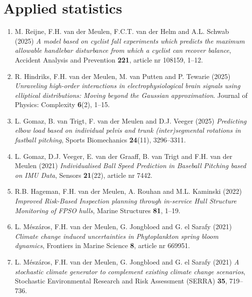 \documentclass[
10pt, %
a4paper, %
oneside, %
headinclude,footinclude, %
BCOR5mm, %
]{scrartcl}
\begin{document}
\section{Applied  statistics}

\begin{enumerate}
\item {\sc M. Reijne, F.H. van der Meulen, F.C.T. van der Helm and A.L. Schwab} (2025) {\it A model based on cyclist fall experiments which predicts the maximum allowable handlebar disturbance from which a cyclist can recover balance},
Accident Analysis and Prevention {\bf 221}, article nr 108159,
1--12.


\item  {\sc R. Hindriks, F.H. van der Meulen, M. van Putten and P. Tewarie} (2025) {\it Unraveling high-order interactions in electrophysiological brain signals using elliptical distributions: Moving beyond the Gaussian approximation}. Journal of Physics: Complexity {\bf 6}(2), 1--15.

\item {\sc L. Gomaz, B. van Trigt, F. van der Meulen and D.J. Veeger} (2025) {\it Predicting elbow load based on individual pelvis and trunk (inter)segmental rotations in fastball pitching}, Sports Biomechanics {\bf 24}(11), 3296--3311. 

\item {\sc L. Gomaz, D.J. Veeger, E. van der Graaff, B. van Trigt and F.H. van der Meulen (2021)} {\it  Individualised Ball Speed Prediction in Baseball Pitching based on IMU Data}, Sensors {\bf 21}(22), article nr 7442.  

\item {\sc R.B. Hageman, F.H. van der Meulen, A. Rouhan and M.L. Kaminski (2022)} {\it  Improved Risk-Based Inspection planning through in-service Hull Structure Monitoring of FPSO hulls}, Marine Structures {\bf 81}, 1--19.

\item {\sc L. M\'esz\'aros, F.H. van der Meulen, G. Jongbloed and G. el Sarafy (2021)} {\it Climate change induced uncertainties in Phytoplankton spring bloom dynamics}, Frontiers in Marine Science {\bf 8}, article nr 669951.


\item {\sc L. M\'esz\'aros, F.H. van der Meulen, G. Jongbloed and G. el Sarafy (2021)} {\it  A stochastic climate generator to complement existing climate change scenarios}, Stochastic Environmental Research and Risk Assessment (SERRA) {\bf 35}, 719--736.


\end{enumerate}
\end{document}
